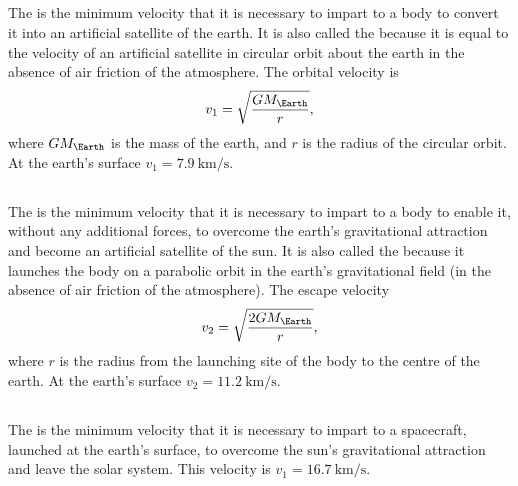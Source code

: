 \subsection{}\label{6.3.4} The  is the minimum velocity that it is necessary to impart to a body to convert it into an artificial satellite of the earth. It is also called the  because it is equal to the velocity of an artificial satellite in circular orbit about the earth in the absence of air friction of the atmosphere. The orbital velocity is
\begin{equation*}%
v_{1}= \sqrt{\frac{GM_{\Earth}}{r}},
\end{equation*}
where $GM_{\Earth}$ is the mass of the earth, and $r$ is the radius of the circular orbit. At the earth's surface $v_{1}=\SI{7.9}{\kilo\meter\per\second}$.

\subsection{}\label{6.3.5} The  is the minimum velocity that it is necessary to impart to a body to enable it, without any addi­tional forces, to overcome the earth's gravitational attraction and become an artificial satellite of the sun. It is also called the  because it launches the body on a para­bolic orbit in the earth's gravitational field (in the absence of air friction of the atmosphere). The escape velocity
\begin{equation*}%
v_{2}= \sqrt{\frac{2GM_{\Earth}}{r}},
\end{equation*}
where $r$ is the radius from the launching site of the body to the centre of the earth. At the earth's surface $v_{2}=\SI{11.2}{\kilo\meter\per\second}$.

\subsection{}\label{6.3.6} The  is the minimum velocity that it is necessary to impart to a spacecraft, launched at the earth's surface, to overcome the sun's gravitational attraction and leave the solar system. This velocity is $v_{1}=\SI{16.7}{\kilo\meter\per\second}$.

